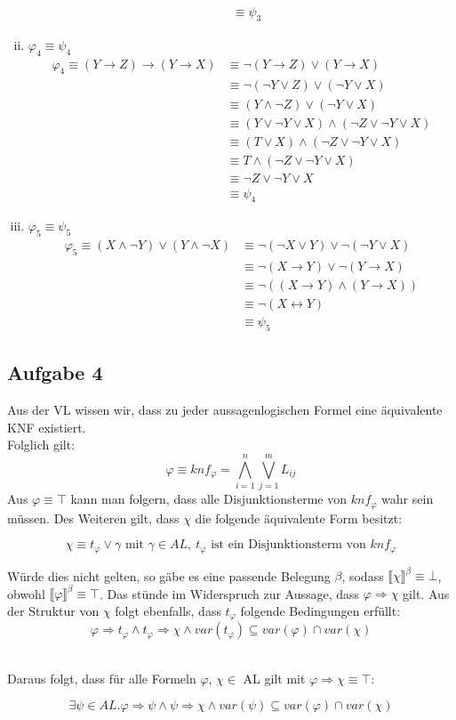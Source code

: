 \documentclass[a4paper,10pt]{article}
\begin{document}
\begin{enumerate}[(i)]
\begin{align*}
	&\equiv \psi_3 
	\end{align*}
\item $\varphi_4 \equiv \psi_4$
	\begin{align*}
	\varphi_4 \equiv (Y \rightarrow Z) \rightarrow (Y \rightarrow X) 
	&\equiv \neg (Y \rightarrow Z) \vee (Y \rightarrow X) \\
	&\equiv \neg (\neg Y \vee Z) \vee (\neg Y \vee X) \\
	&\equiv (Y \wedge \neg Z) \vee (\neg Y \vee X) \\
	&\equiv (Y \vee \neg Y \vee X) \wedge (\neg Z \vee \neg Y \vee X)\\
	&\equiv (T \vee X) \wedge (\neg Z \vee \neg Y \vee X)\\
	&\equiv T \wedge (\neg Z \vee \neg Y \vee X)\\
	&\equiv \neg Z \vee \neg Y \vee X\\
	&\equiv \psi_4 
	\end{align*}
\item $\varphi_5 \equiv \psi_5$
	\begin{align*}
	\varphi_5 \equiv (X \wedge\neg Y) \vee (Y \wedge \neg X) 
	&\equiv \neg (\neg X \vee Y) \vee \neg (\neg Y \vee X) \\
	&\equiv \neg (X \rightarrow Y) \vee \neg (Y \rightarrow X) \\
	&\equiv \neg ((X \rightarrow Y) \wedge (Y \rightarrow X)) \\
	&\equiv \neg (X \leftrightarrow Y) \\
	&\equiv \psi_5 
	\end{align*}
\end{enumerate}
\newpage
	\subsection*{Aufgabe 4}
	Aus der VL wissen wir, dass zu jeder aussagenlogischen Formel eine äquivalente KNF existiert. \\
	Folglich gilt: $$\varphi \equiv knf_{\varphi} = \bigwedge\limits_{i=1}^{n} \bigvee\limits_{j=1}^{m} L_{ij}$$ 
	Aus $\varphi \equiv \top$ kann man folgern, dass alle Disjunktionsterme von $knf_{\varphi}$ wahr sein müssen. Des Weiteren gilt, dass $\chi$ die folgende äquivalente Form besitzt:

	$$ \chi \equiv t_{\varphi} \vee \gamma \text{ mit } 
	\gamma \in AL,~t_{\varphi} \text{ ist ein Disjunktionsterm von } knf_{\varphi} $$ 	

	Würde dies nicht gelten, so gäbe es eine passende Belegung $\beta$, sodass $\llbracket \chi \rrbracket ^\beta \equiv \bot$, obwohl $\llbracket \varphi \rrbracket ^\beta \equiv \top$. 
	Das stünde im Widerspruch zur Aussage, dass $\varphi \Rightarrow \chi$ gilt.
	Aus der Struktur von $\chi$ folgt ebenfalls, dass $t_{\varphi}$ folgende Bedingungen erfüllt:
	$$\varphi \Rightarrow t_{\varphi} \wedge t_{\varphi} \Rightarrow \chi \wedge var(t_{\varphi}) \subseteq 		  	var(\varphi) \cap var(\chi) $$

	\ \\Daraus folgt, dass für alle Formeln $\varphi$, $\chi \in$ AL gilt mit $\varphi \Rightarrow \chi \equiv \top$:

	$$\exists \psi \in AL. \varphi \Rightarrow \psi \wedge 
	\psi \Rightarrow \chi \wedge var(\psi) \subseteq var(\varphi) \cap var(\chi) $$
\end{document}
